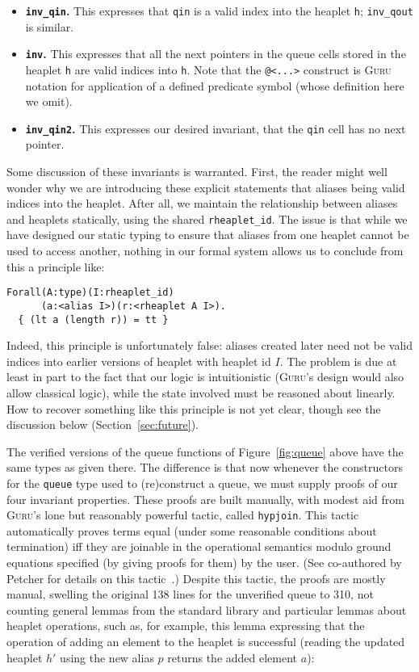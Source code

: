 \documentclass[9pt,natbib]{sigplanconf}
\begin{document}
\begin{itemize}
\item \textbf{\texttt{inv\_qin}.}  This expresses that \texttt{qin} is
a valid index into the heaplet \texttt{h}; \texttt{inv\_qout} is similar.
\item \textbf{\texttt{inv}.} This expresses that all the next pointers
  in the queue cells stored in the heaplet \texttt{h} are valid
  indices into \texttt{h}.  Note that the \texttt{@<...>} construct is
  \textsc{Guru} notation for application of a defined predicate symbol
  (whose definition here we omit).
\item \textbf{\texttt{inv\_qin2}.} This expresses our desired
  invariant, that the \texttt{qin} cell has no next pointer.
\end{itemize}

\noindent Some discussion of these invariants is warranted.  First,
the reader might well wonder why we are introducing these explicit
statements that aliases being valid indices into the heaplet.  After
all, we maintain the relationship between aliases and heaplets
statically, using the shared \texttt{rheaplet\_id}.  The issue is that
while we have designed our static typing to ensure that aliases from
one heaplet cannot be used to access another, nothing in our formal
system allows us to conclude from this a principle like:

{\small
\begin{verbatim}
Forall(A:type)(I:rheaplet_id)
      (a:<alias I>)(r:<rheaplet A I>).
  { (lt a (length r)) = tt }
\end{verbatim}
}

\noindent Indeed, this principle is unfortunately false: aliases
created later need not be valid indices into earlier versions of
heaplet with heaplet id $I$.  The problem is due at least in part to
the fact that our logic is intuitionistic (\textsc{Guru}'s design
would also allow classical logic), while the state involved must be
reasoned about linearly.  How to recover something like this principle
is not yet clear, though see the discussion below
(Section~\ref{sec:future}).

The verified versions of the queue functions of Figure~\ref{fig:queue}
above have the same types as given there.  The difference is that now
whenever the constructors for the \texttt{queue} type used to
(re)construct a queue, we must supply proofs of our four invariant
properties.  These proofs are built manually, with modest aid from
\textsc{Guru}'s lone but reasonably powerful tactic, called
\texttt{hypjoin}.  This tactic automatically proves terms equal (under
some reasonable conditions about termination) iff they are joinable in
the operational semantics modulo ground equations specified (by giving
proofs for them) by the user.  (See co-authored by Petcher for details
on this tactic~\cite{petcher09,petcher08}.)  Despite this tactic, the
proofs are mostly manual, swelling the original 138 lines for the
unverified queue to 310, not counting general lemmas from the standard
library and particular lemmas about heaplet operations, such as, for
example, this lemma expressing that the operation of adding an element
to the heaplet is successful (reading the updated heaplet $h'$ using
the new alias $p$ returns the added element $a$):
\end{document}
